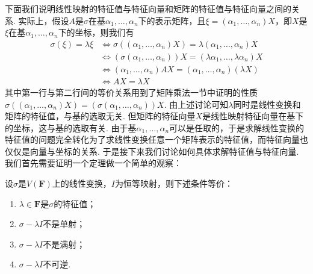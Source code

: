 下面我们说明线性映射的特征值与特征向量和矩阵的特征值与特征向量之间的关系. 实际上，假设$A$是$\sigma$在基$\alpha_1,\ldots,\alpha_n$下的表示矩阵，且$\xi=(\alpha_1,\ldots,\alpha_n)X$，即$X$是$\xi$在基$\alpha_1,\ldots,\alpha_n$下的坐标，则我们有
\begin{align*}
    \sigma(\xi)=\lambda\xi & \iff \sigma((\alpha_1,\ldots,\alpha_n)X)=\lambda(\alpha_1,\ldots,\alpha_n)X        \\
                           & \iff (\sigma(\alpha_1,\ldots,\alpha_n))X=(\lambda\alpha_1,\ldots,\lambda\alpha_n)X \\
                           & \iff (\alpha_1,\ldots,\alpha_n)AX=(\alpha_1,\ldots,\alpha_n)(\lambda X)            \\
                           & \iff AX=\lambda X
\end{align*}
其中第一行与第二行间的等价关系用到了矩阵乘法一节中证明的性质$\sigma((\alpha_1,\ldots,\alpha_n)X)=(\sigma(\alpha_1,\ldots,\alpha_n))X$. 由上述讨论可知$\lambda$同时是线性变换和矩阵的特征值，与基的选取无关. 但矩阵的特征向量$X$是线性映射特征向量在基下的坐标，这与基的选取有关. 由于基$\alpha_1,\ldots,\alpha_n$可以是任取的，于是求解线性变换的特征值的问题完全转化为了求线性变换任意一个矩阵表示的特征值，而特征向量也仅仅是向量与坐标的关系. 于是接下来我们讨论如何具体求解特征值与特征向量. 我们首先需要证明一个定理做一个简单的观察：
\begin{theorem}{}{}
    设$\sigma$是$V(\mathbf{F})$上的线性变换，$I$为恒等映射，则下述条件等价：
    \begin{enumerate}[label=(\arabic*)]
        \item \label{item:18:特征值定义:1}
              $\lambda\in\mathbf{F}$是$\sigma$的特征值；

        \item \label{item:18:特征值定义:2}
              $\sigma-\lambda I$不是单射；

        \item \label{item:18:特征值定义:3}
              $\sigma-\lambda I$不是满射；

        \item \label{item:18:特征值定义:4}
              $\sigma-\lambda I$不可逆.
    \end{enumerate}
\end{theorem}

